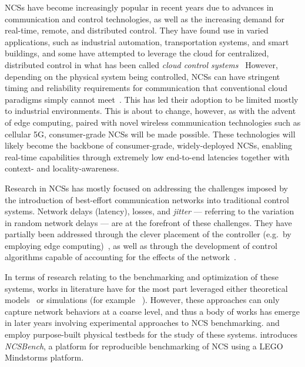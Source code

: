 \glspl{NCS} have become increasingly popular in recent years due to advances in communication and control technologies, as well as the increasing demand for real-time, remote, and distributed control.
They have found use in varied applications, such as industrial automation, transportation systems, and smart buildings, and some have attempted to leverage the cloud for centralized, distributed control in what has been called \emph{cloud control systems}~\cite{xia2015cloud}
However, depending on the physical system being controlled, \glspl{NCS} can have stringent timing and reliability requirements for communication that conventional cloud paradigms simply cannot meet~\cite{wan2020efficient}.
This has led their adoption to be limited mostly to industrial environments.
This is about to change, however, as with the advent of edge computing, paired with novel wireless communication technologies such as cellular 5G, consumer-grade \glspl{NCS} will be made possible.
These technologies will likely become the backbone of consumer-grade, widely-deployed \glspl{NCS}, enabling real-time capabilities through extremely low end-to-end latencies together with context- and locality-awareness.

\medskip
Research in \glspl{NCS} has mostly focused on addressing the challenges imposed by the introduction of best-effort communication networks into traditional control systems.
Network delays (latency), losses, and \emph{jitter} --- referring to the variation in random network delays --- are at the forefront of these challenges.
They have partially been addressed through the clever placement of the controller (e.g.\ by employing edge computing)~\cite{sasaki2017layered,sasaki2016vehicle}, as well as through the development of control algorithms capable of accounting for the effects of the network~\cite{zhang2013network}.

In terms of research relating to the benchmarking and optimization of these systems, works in literature have for the most part leveraged either theoretical models~\cite{zhang2019networked} or simulations (for example ~\cite{ma2019optimal}).
However, these approaches can only capture network behaviors at a coarse level, and thus a body of works has emerge in later years involving experimental approaches to \gls{NCS} benchmarking.
\cite{baumann2018evaluating} and~\cite{cuenca2019periodic} employ purpose-built physical testbeds for the study of these systems.
\cite{zoppi2020ncsbench} introduces \emph{NCSBench}, a platform for reproducible benchmarking of \gls{NCS} using a LEGO Mindstorms platform.

